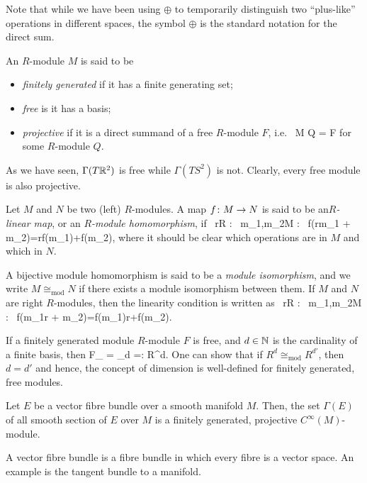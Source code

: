 Note that while we have been using $\oplus$ to temporarily distinguish two ``plus-like'' operations in different spaces, the symbol $\oplus$ is the standard notation for the direct sum.

\bd
An $R$-module $M$ is said to be
\begin{itemize}
\item \emph{finitely generated} if it has a finite generating set;
\item \emph{free} is it has a basis;
\item \emph{projective} if it is a direct summand of a free $R$-module $F$, i.e.\
\bse
M \oplus Q = F
\ese
for some $R$-module $Q$.
\end{itemize}
\ed

\be
As we have seen, $\Gamma(T\mathbb{R}^2)$ is free while $\Gamma(TS^2)$ is not. 
\ee
\be
Clearly, every free module is also projective.
\ee

\bd
Let $M$ and $N$ be two (left) $R$-modules. A map $f\colon M \to N$ is said to be an\emph{$R$-linear map}, or an \emph{$R$-module homomorphism}, if
\bse
\forall \, r\in R : \forall \, m_1,m_2\in M : \ f(rm_1 + m_2)=rf(m_1)+f(m_2),
\ese
where it should be clear which operations are in $M$ and which in $N$.

A bijective module homomorphism is said to be a \emph{module isomorphism}, and we write $M\cong_{\mathrm{mod}}N$ if there exists a module isomorphism between them.
\ed
If $M$ and $N$ are right $R$-modules, then the linearity condition is written as
\bse
\forall \, r\in R : \forall \, m_1,m_2\in M : \ f(m_1r + m_2)=f(m_1)r+f(m_2).
\ese

\bp
If a finitely generated module $R$-module $F$ is free, and $d\in \mathbb{N}$ is the cardinality of a finite basis, then
\bse
F\cong_ = _{d } =: R^d.
\ese
\ep
One can show that if $R^d\cong_\mathrm{mod} R^{d'}$, then $d=d'$ and hence, the concept of dimension is well-defined for finitely generated, free modules.

\begin{theorem}
Let $E$ be a vector fibre bundle over a smooth manifold $M$. Then, the set $\Gamma(E)$ of all smooth section of $E$ over $M$ is a finitely generated, projective $C^\infty(M)$-module.
\end{theorem}

A vector fibre bundle is a fibre bundle in which every fibre is a vector space. An example is the tangent bundle to a manifold.

